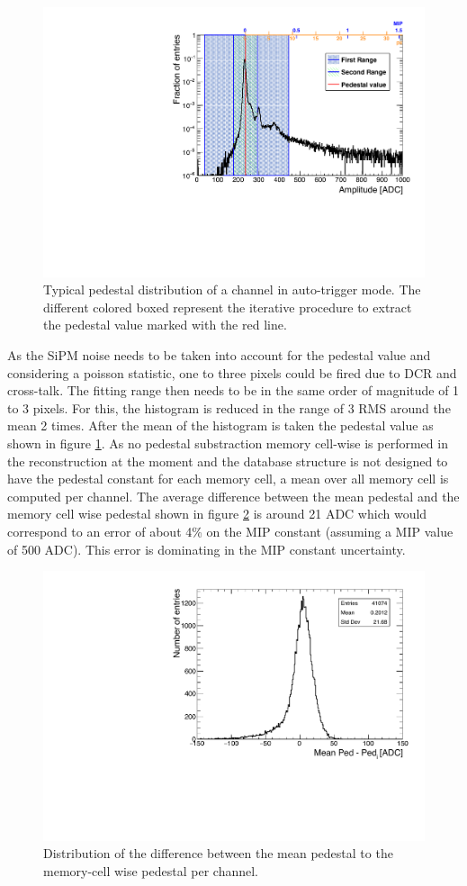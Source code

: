 \begin{figure}[htbp!]
	\centering
	\includegraphics[width=0.7\linewidth]{chap5/fig_EnergyCalib/PedestalExtractionExample.pdf}
	\caption{Typical pedestal distribution of a channel in auto-trigger mode. The different colored boxed represent the iterative procedure to extract the pedestal value marked with the red line.} \label{fig:PedExtraction}
\end{figure}

As the SiPM noise needs to be taken into account for the pedestal value and considering a poisson statistic, one to three pixels could be fired due to DCR and cross-talk. The fitting range then needs to be in the same order of magnitude of 1 to 3 pixels. For this, the histogram is reduced in the range of 3 RMS around the mean 2 times. After the mean of the histogram is taken the pedestal value as shown in figure \ref{fig:PedExtraction}. As no pedestal substraction memory cell-wise is performed in the reconstruction at the moment and the database structure is not designed to have the pedestal constant for each memory cell, a mean over all memory cell is computed per channel. The average difference between the mean pedestal and the memory cell wise pedestal shown in figure \ref{fig:CompMeanMem} is around 21 ADC which would correspond to an error of about 4\% on the MIP constant (assuming a MIP value of 500 ADC). This error is dominating in the MIP constant uncertainty.

\begin{figure}[htbp!]
	\centering
	\includegraphics[width=0.7\linewidth]{chap5/fig_EnergyCalib/ComparisonMeanPedtoMemorycell.pdf}
	\caption{Distribution of the difference between the mean pedestal to the memory-cell wise pedestal per channel.} \label{fig:CompMeanMem}
\end{figure}

